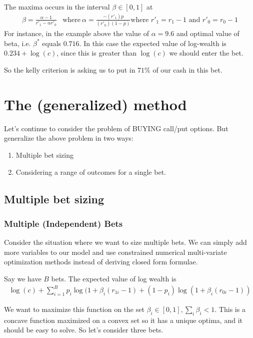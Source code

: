 \documentclass{article}
\begin{document}
The maxima occurs in the interval $\beta \in [0, 1]$ at 
\begin{align}
\beta  = \frac{\alpha - 1}{r'_1 - \alpha r'_0} &\text{where}\ \alpha = \frac{-(r'_1)p}{(r'_0)(1-p)} \text{where } r'_1 = r_1 - 1 \text{ and } r'_0 = r_0 - 1 
\end{align}
For instance, in the example above the value of $\alpha = 9.6$ and optimal value of beta, i.e. $\beta^*$ equals $0.716$. In this case the expected value of log-wealth is $0.234 + \log(c)$, since this is greater than $\log(c)$ we should enter the bet.


So the kelly criterion is asking us to put in $71\%$ of our cash in this bet.

\section{The (generalized) method}
Let's continue to consider the problem of BUYING call/put options. But generalize the above problem in two ways:
\begin{enumerate}
    \item Multiple bet sizing
    \item Considering a range of outcomes for a single bet.
\end{enumerate}

\subsection{Multiple bet sizing}
\subsubsection{Multiple (Independent) Bets}
Consider the situation where we want to size multiple bets. We can simply add more variables to our model and use constrained numerical multi-variate optimization methods instead of deriving closed form formulae. 

Say we have $B$ bets. The expected value of log wealth is
\begin{align}
\log(c) + \sum_{i=1}^B p_i \log(1 + \beta_i (r_{1i} -1) + (1 -p_i) \log(1 + \beta_i (r_{0i} - 1))
\end{align}

We  want to maximize this function on the set $\beta_i \in [0, 1], \sum_i \beta_i < 1$. This is a concave function maximized on a convex set so it has a unique optima, and it should be easy to solve. So let's consider three bets.
\end{document}
